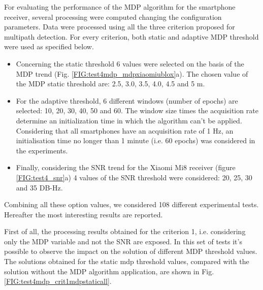 For evaluating the performance of the MDP algorithm for the smartphone receiver, several processing were computed changing the configuration parameters. Data were processed using all the three criterion proposed for multipath detection. For every criterion, both static and adaptive MDP threshold were used as specified below.
\begin{itemize}
\item Concerning the static threshold 6 values were selected on the basis of the MDP trend (Fig. \ref{FIG:test4mdp_mdpxiaomiublox}a). The chosen value of the MDP static threshold are: 2.5, 3.0, 3.5, 4.0, 4.5 and 5 m.
\item For the adaptive threshold, 6 different windows (number of epochs) are selected: 10, 20, 30, 40, 50 and 60. The window size times the acquisition rate determine  an initialization time in which the algorithm can't be applied. Considering that all smartphones have an acquisition rate of 1 Hz, an initialisation time no longer than 1 minute (i.e. 60  epochs) was considered in the experiments.
\item  Finally, considering the SNR trend for the Xiaomi Mi8 receiver (figure \ref{FIG:test4_snr}a) 4 values of the SNR threshold were considered: 20, 25, 30 and 35 DB-Hz. 
\end{itemize}
 Combining all these option values, we considered 108 different experimental tests. Hereafter the most interesting results are reported.  

First of all, the processing results obtained for the criterion 1, i.e. considering only the MDP variable and not the SNR are exposed. In this set of tests it's possible to observe the impact on the solution of different MDP threshold values. The solutions obtained for the static mdp threshold values, compared with the solution without the MDP algorithm application, are shown in Fig.  \ref{FIG:test4mdp_crit1mdpstaticall}.

